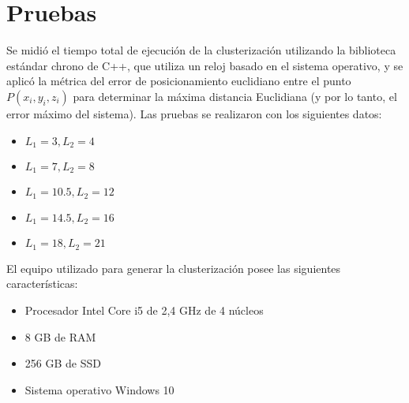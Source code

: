\section{Pruebas}

Se midió el tiempo total de ejecución de la clusterización utilizando la biblioteca estándar chrono de C++, que utiliza un reloj basado en el sistema operativo, y se aplicó la métrica del error de posicionamiento euclidiano entre el punto $P(x_i, y_i, z_i)$ para determinar la máxima distancia Euclidiana (y por lo tanto, el error máximo del sistema). Las pruebas se realizaron con los siguientes datos:

\begin{itemize}
	\item $L_1 = 3, L_2 = 4$
	\item $L_1 = 7, L_2 = 8$
	\item $L_1 = 10.5, L_2 = 12$
	\item $L_1 = 14.5, L_2 = 16$
	\item $L_1 = 18, L_2 = 21$
\end{itemize}

El equipo utilizado para generar la clusterización posee las siguientes características:

\begin{itemize}
	\item Procesador Intel Core i5 de 2,4 GHz de 4 núcleos
	\item 8 GB de RAM
	\item 256 GB de SSD
	\item Sistema operativo Windows 10
\end{itemize}

